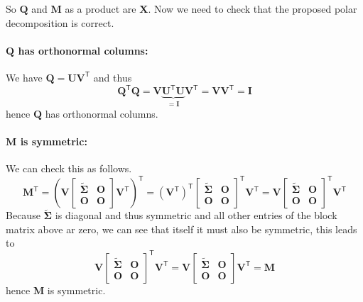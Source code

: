 \documentclass{article}
\newcommand\tr{\mathsf{T}}
\begin{document}
\pagebreak

\noindent So $\mathbf{Q}$ and $\mathbf{M}$ as a product are $\mathbf{X}$. Now we need to check that the proposed polar decomposition is correct. 

\paragraph{$\mathbf{Q}$ has orthonormal columns:} We have $\mathbf{Q} = \mathbf{U}\mathbf{V}^{\tr}$ and thus
\begin{equation*}
    \mathbf{Q}^{\tr}\mathbf{Q} = \mathbf{V}\underbrace{\mathbf{U}^{\tr}\mathbf{U}}_{= \mathbf{I}}\mathbf{V}^{\tr} = \mathbf{V}\mathbf{V}^{\tr} = \mathbf{I}
\end{equation*}
hence $\mathbf{Q}$ has orthonormal columns.
\paragraph{$\mathbf{M}$ is symmetric:} We can check this as follows.
\begin{equation*}
    \mathbf{M}^{\tr} = \left(\mathbf{V}\begin{bmatrix}
        \mathbf{\tilde{\Sigma}} &\mathbf{O} \\
        \mathbf{O} & \mathbf{O}
    \end{bmatrix}\mathbf{V}^{\tr}\right)^{\tr} = \left(\mathbf{V}^{\tr}\right)^{\tr}\begin{bmatrix}
        \mathbf{\tilde{\Sigma}} &\mathbf{O} \\
        \mathbf{O} & \mathbf{O}
    \end{bmatrix}^{\tr}\mathbf{V}^{\tr} 
    = \mathbf{V}\begin{bmatrix}
        \mathbf{\tilde{\Sigma}} &\mathbf{O} \\
        \mathbf{O} & \mathbf{O}
    \end{bmatrix}^{\tr}\mathbf{V}^{\tr}
\end{equation*}
Because $\mathbf{\tilde{\Sigma}}$ is diagonal and thus symmetric and all other entries of the block matrix above ar zero, we can see that itself it must also be symmetric, this leads to
\begin{equation*}
    \mathbf{V}\begin{bmatrix}
        \mathbf{\tilde{\Sigma}} &\mathbf{O} \\
        \mathbf{O} & \mathbf{O}
    \end{bmatrix}^{\tr}\mathbf{V}^{\tr} = \mathbf{V}\begin{bmatrix}
        \mathbf{\tilde{\Sigma}} &\mathbf{O} \\
        \mathbf{O} & \mathbf{O}
    \end{bmatrix}\mathbf{V}^{\tr} = \mathbf{M}
\end{equation*}
hence $\mathbf{M}$ is symmetric.
\end{document}
